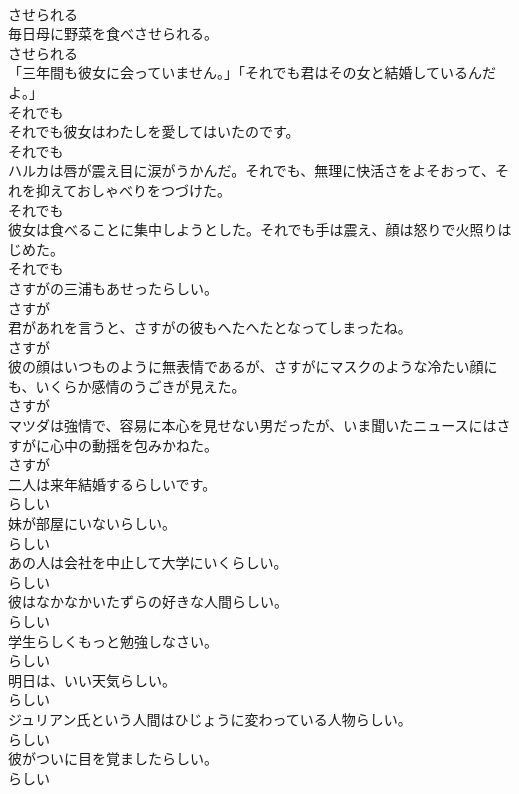 \documentclass[8pt]{extreport}
\begin{document}
\begin{CJK}{UTF8}{min}
\\	させられる	
\\	毎日母に野菜を食べさせられる。	
\\	させられる	
\\	「三年間も彼女に会っていません。」「それでも君はその女と結婚しているんだよ。」	
\\	それでも	
\\	それでも彼女はわたしを愛してはいたのです。	
\\	それでも	
\\	ハルカは唇が震え目に涙がうかんだ。それでも、無理に快活さをよそおって、それを抑えておしゃべりをつづけた。	
\\	それでも	
\\	彼女は食べることに集中しようとした。それでも手は震え、顔は怒りで火照りはじめた。	
\\	それでも	
\\	さすがの三浦もあせったらしい。	
\\	さすが	
\\	君があれを言うと、さすがの彼もへたへたとなってしまったね。	
\\	さすが	
\\	彼の顔はいつものように無表情であるが、さすがにマスクのような冷たい顔にも、いくらか感情のうごきが見えた。	
\\	さすが	
\\	マツダは強情で、容易に本心を見せない男だったが、いま聞いたニュースにはさすがに心中の動揺を包みかねた。	
\\	さすが	
\\	二人は来年結婚するらしいです。	
\\	らしい	
\\	妹が部屋にいないらしい。	
\\	らしい	
\\	あの人は会社を中止して大学にいくらしい。	
\\	らしい	
\\	彼はなかなかいたずらの好きな人間らしい。	
\\	らしい	
\\	学生らしくもっと勉強しなさい。	
\\	らしい	
\\	明日は、いい天気らしい。	
\\	らしい	
\\	ジュリアン氏という人間はひじょうに変わっている人物らしい。	
\\	らしい	
\\	彼がついに目を覚ましたらしい。	
\\	らしい	

\end{CJK}
\end{document}
